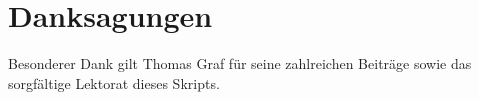 \chapter*{Danksagungen}

Besonderer Dank gilt Thomas Graf für seine zahlreichen Beiträge sowie das sorgfältige Lektorat dieses Skripts.